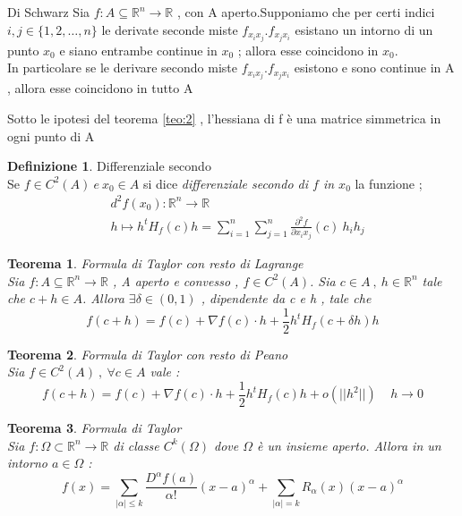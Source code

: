 \documentclass{article}
\newtheorem{teorema}{Teorema}[subsection]
\theoremstyle{definition}
\newtheorem*{definizione}{Definizione}
\newcommand{\R}{\mathbb{R}}
\newcommand{\Rn}{\R^n}
\newcommand{\fn}{f: A\subseteq \Rn \rightarrow \R}
\begin{document}
	
	
	
	\begin{teo}{Di Schwarz }{}
		\label{teo:2}
		Sia $\fn$ , con A aperto.Supponiamo che per certi indici $i,j \in \{1,2,\dots,n\}$ le derivate seconde miste $f_{x_ix_j}.f_{x_jx_i}$ esistano un intorno di un punto $x_0$ e siano entrambe continue in $x_0$ ; allora esse coincidono in $x_0$. \\In particolare se le derivare secondo miste $f_{x_ix_j}.f_{x_jx_i}$ esistono e sono continue in A , allora esse coincidono in tutto A  
	\end{teo}
	Sotto le ipotesi del teorema \ref{teo:2} , l'hessiana di f è una matrice simmetrica in ogni punto di A 
	\begin{definizione}
		Differenziale secondo \\
		Se $f \in C^2(A) \ e \ x_0 \in A$ si dice \textit{differenziale secondo di $f$ in $x_0$} la funzione ; 
		\begin{align*}
			&d^2f(x_0):\Rn \rightarrow \R \\
			&h \mapsto h^tH_f(c)h=\sum_{i=1}^n \sum_{j=1}^n  \frac{\partial^2f}{\partial x_i x_j}(c) \ h_i h_j
		\end{align*}
	\end{definizione}
	\begin{teorema}
		Formula di Taylor con resto di Lagrange \\
		Sia $\fn$ , A aperto e convesso , $f \in C^2(A)$. Sia $c \in A\ , \ h \in \Rn$ tale che $c+h \in A$. Allora $\exists \delta \in (0,1) $ , dipendente da c e h , tale che 
		$$f(c+h)=f(c)+\nabla f(c) \cdot h +\frac{1}{2} h^t H_f (c+\delta h)h$$
	\end{teorema}
	
	\begin{teorema}
		Formula di Taylor con resto di Peano \\
		Sia $f \in C^2(A) \ , \ \forall c \in A$ vale :
		$$f(c+h)=f(c)+\nabla f(c) \cdot h +\frac{1}{2} h^t H_f (c)h+o(||h^2||)\ \ \ \ \ h \rightarrow 0$$
	\end{teorema}
	\begin{teorema}
		Formula di Taylor \\
		Sia $f:\Omega \subset \Rn \rightarrow \R $ di classe $C^k(\Omega)$ dove $\Omega$ è un insieme aperto. Allora in un intorno $a \in \Omega$ : 
		$$f(x)=\sum_{|\alpha|\leq k}\frac{D^{\alpha}f(a)}{\alpha !}(x-a)^\alpha + \sum_{|\alpha|=k}R_{\alpha}(x)(x-a)^\alpha $$ 
	\end{teorema}
\end{document}
